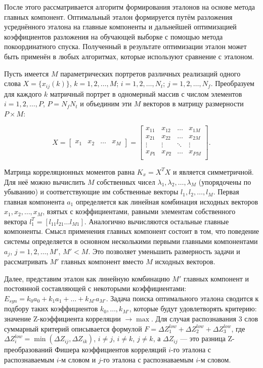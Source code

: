 После этого рассматривается алгоритм формирования эталонов на основе метода главных компонент.
Оптимальный эталон формируется путём разложения усреднённого эталона на главные компоненты и дальнейшей оптимизацией коэффициентов разложения на обучающей выборке с помощью метода покоординатного спуска.
Полученный в результате оптимизации эталон может быть применён в любых алгоритмах, которые используют сравнение с эталоном.

Пусть имеется $M$ параметрических портретов различных реализаций одного слова $X = \{x_{ij}(k)\}$, $k = 1, 2, \dots, M$; $i = 1, 2, \dots, N_t$; $j = 1, 2, \dots, N_f$.
Преобразуем для каждого $k$ матричный портрет в одномерный массив с числом элементов $i = 1, 2, \dots, P$, $P = N_f N_t$ и объединим эти $M$ векторов в матрицу размерности $P \times M$:

\begin{equation}
X = \begin{bmatrix} x_1 & x_2 & \dots & x_M \end{bmatrix} = 
\begin{bmatrix}
	x_{11} & x_{12} & \dots  & x_{1M} \\
	x_{21} & x_{22} & \dots  & x_{2M} \\ 
	\vdots & \vdots & \ddots & \vdots \\
	x_{P1} & x_{P2} & \dots  & x_{PM} \\
\end{bmatrix}.
\end{equation}

Матрица корреляционных моментов равна $K_x = X^T X$ и является симметричной.
Для неё можно вычислить $M$ собственных чисел $\lambda_1, \lambda_2, \dots, \lambda_M$ (упорядочены по убыванию) и соответствующие им собственные векторы $l_1, l_2, \dots, l_M$.
Первая главная компонента $a_1$ определяется как линейная комбинация исходных векторов $x_1, x_2, \dots, x_M$, взятых с коэффициентами, равными элементам собственного вектора $l_1^T= [l_{11} l_{21} \dots l_{M1}]$.
Аналогично вычисляются остальные главные компоненты.
Смысл применения главных компонент состоит в том, что поведение системы определяется в основном несколькими первыми главными компонентами $a_j$, $j = 1, 2, \dots, M'$, $M' < M$.
Это позволяет уменьшить размерность задачи и рассматривать $M'$ главных компонент вместо $M$ исходных векторов.

Далее, представим эталон как линейную комбинацию $M'$ главных компонент и постоянной составляющей с некоторыми коэффициентами: $E_{syn} = k_0 a_0 + k_1 a_1 + \dots + k_{M'} a_{M'}$.
Задача поиска оптимального эталона сводится к подбору таких коэффициентов $k_0, \dots, k_{M'}$, которые будут удовлетворять критерию: значение Z-коэффициента корреляции $\rightarrow \max$.
Для случая распознавания 3 слов суммарный критерий описывается формулой $F = \Delta Z^{low}_{1} + \Delta Z^{low}_{2} + \Delta Z^{low}_{3}$, где $\Delta Z^{low}_{i} = \min(\Delta Z_{ij}, \Delta Z_{ik})$, $i \ne j$, $i \ne k$, $j \ne k$, а $\Delta Z_{ij}$ --- это разница Z-преобразований Фишера коэффициентов корреляций $i$-го эталона с распознаваемым $i$-м словом и $j$-го эталона с распознаваемым $i$-м словом. 

